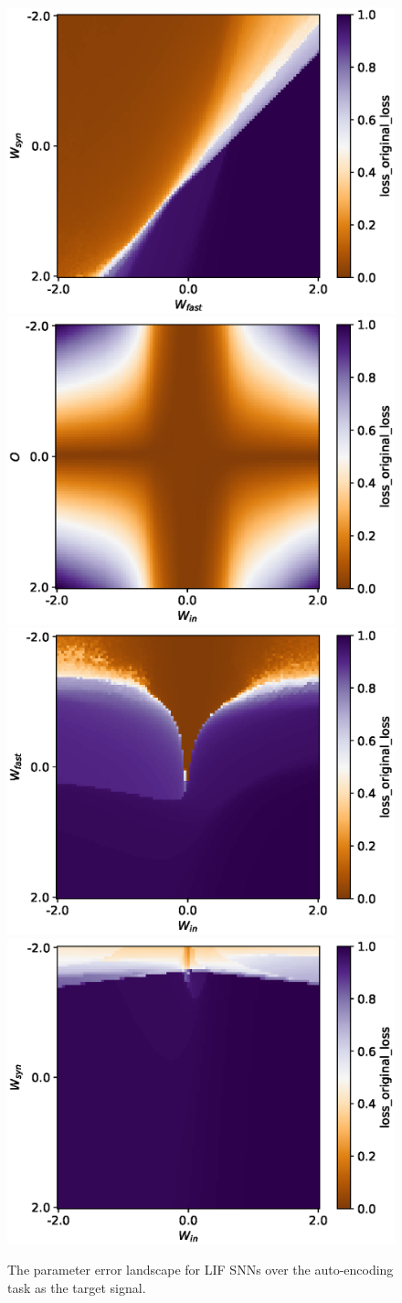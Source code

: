 \documentclass[mphil,deptreport,ianc]{infthesis} %
\begin{document}
\begin{figure}
    \centering
    \includegraphics[width=0.49\columnwidth]{figures/param_landscape_heatmaps/gating/LIF/test_export_2d_heatmap_N_4_loss_original_loss_W_fast_W_syn.eps}
    \includegraphics[width=0.49\columnwidth]{figures/param_landscape_heatmaps/gating/LIF/test_export_2d_heatmap_N_4_loss_original_loss_W_in_O.eps}
    \includegraphics[width=0.49\columnwidth]{figures/param_landscape_heatmaps/gating/LIF/test_export_2d_heatmap_N_4_loss_original_loss_W_in_W_fast.eps}
    \includegraphics[width=0.49\columnwidth]{figures/param_landscape_heatmaps/gating/LIF/test_export_2d_heatmap_N_4_loss_original_loss_W_in_W_syn.eps}
    \caption{The parameter error landscape for LIF SNNs over the auto-encoding task as the target signal.}
    \label{fig:p_landscape_LIF_autoencoding}
\end{figure}
\end{document}
